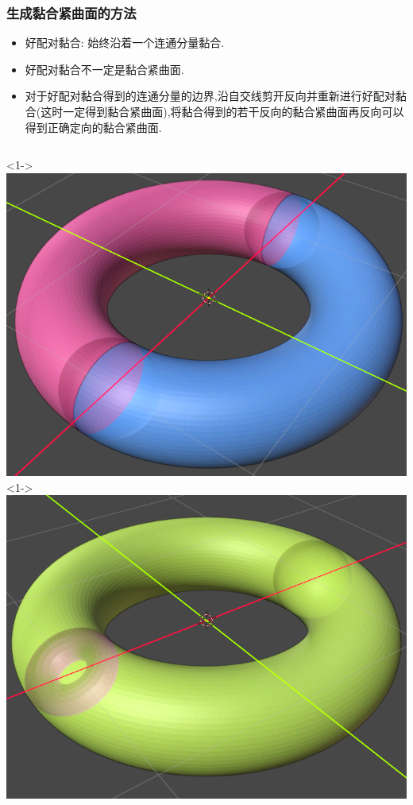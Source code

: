 \documentclass[UTF8]{ctexbeamer}	%
\theoremstyle{plain}
\theoremstyle{definition}
\theoremstyle{remark}
\numberwithin{equation}{section}
\begin{document}
\begin{frame}
    \frametitle{生成黏合紧曲面的方法}
    \begin{itemize}
      \item 好配对黏合: 始终沿着一个连通分量黏合.
        \item 好配对黏合不一定是黏合紧曲面.
        \item 对于好配对黏合得到的连通分量的边界,沿自交线剪开反向并重新进行好配对黏合(这时一定得到黏合紧曲面),将黏合得到的若干反向的黏合紧曲面再反向可以得到正确定向的黏合紧曲面.
    \end{itemize}
    \vspace{0.1in}
     \begin{columns}
        <1->
        \includegraphics[width = \textwidth]{fig/ys1.png}
        <1->
        \includegraphics[width = \textwidth]{fig/ys2.png}
    \end{columns}
\end{frame}
\end{document}
